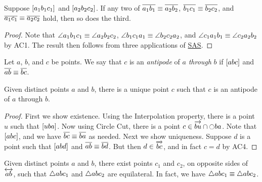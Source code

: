 \begin{cor}\label{cor:segment-addition}
Suppose \([ a_1 b_1 c_1 ]\) and \([ a_2 b_2 c_2 ]\).
If any two of \(\overline{a_1b_1} \equiv \overline{a_2b_2}\), \(\overline{b_1c_1} \equiv \overline{b_2c_2}\), and \(\overline{a_1c_1} \equiv \overline{a_2c_2}\) hold, then so does the third.
\end{cor}

\begin{proof}
Note that \(\angle{a_1b_1c_1} \equiv \angle{a_2b_2c_2}\), \(\angle{b_1c_1a_1} \equiv \angle{b_2c_2a_2}\), and \(\angle{c_1a_1b_1} \equiv \angle{c_2a_2b_2}\) by AC1.
The result then follows from three applications of \hyperref[prop:sas-theorem]{SAS}.
\end{proof}

\begin{dfn}[Antipode]
Let \(a\), \(b\), and \(c\) be points.
We say that \(c\) is an \emph{antipode} of \(a\) \emph{through} \(b\) if \([ a b c ]\) and \(\overline{ab} \equiv \overline{bc}\).
\end{dfn}

\begin{construct}[Antipode]\label{construct:antipode}
Given distinct points \(a\) and \(b\), there is a unique point \(c\) such that \(c\) is an antipode of \(a\) through \(b\).
\end{construct}

\begin{proof}
First we show existence.
Using the Interpolation property, there is a point \(u\) such that \([ u b a ]\).
Now using Circle Cut, there is a point \(c \in \overrightarrow{bu} \cap \ocircle{ba}\).
Note that \([ a b c ]\), and we have \(\overline{bc} \equiv \overline{ba}\) as needed.
Next we show uniqueness.
Suppose \(d\) is a point such that \([ a b d ]\) and \(\overline{ab} \equiv \overline{bd}\).
But then \(d \in \overrightarrow{bc}\), and in fact \(c = d\) by AC4.
\end{proof}

\begin{construct}\label{construct:equilateral-points}
Given distinct points \(a\) and \(b\), there exist points \(c_1\) and \(c_2\), on opposite sides of \(\overleftrightarrow{ab}\), such that \(\bigtriangleup{abc_1}\) and \(\bigtriangleup{abc_2}\) are equilateral.
In fact, we have \(\bigtriangleup{abc_1} \equiv \bigtriangleup{abc_2}\).
\end{construct}

